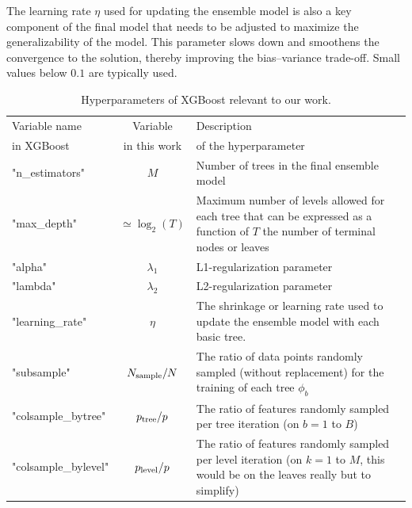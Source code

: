 \documentclass[main]{subfiles}
\begin{document}
The learning rate $\eta$ used for updating the ensemble model is also a key component of the final model that needs to be adjusted to maximize the generalizability of the model. This parameter slows down and smoothens the convergence to the solution, thereby improving the bias--variance trade-off. Small values below $0.1$ are typically used.

\begin{table}[ht]
  \setlength{\extrarowheight}{1pt}
  \centering
  \begin{tabular}{|l|c|m{8cm}|}
  \hline
    Variable name  &  Variable   &   Description\\
    in XGBoost  &    in this work &  of the hyperparameter \\
  \hline
      "n\_estimators" &   $M$ &   Number of trees in the final ensemble model  \\
      "max\_depth" &      $\simeq\log_2(T)$ &   Maximum number of levels allowed for each tree that can be expressed as a function of $T$ the number of terminal nodes or leaves \\
      "alpha" &   $\lambda_1$ &   L1-regularization parameter  \\
      "lambda" &   $\lambda_2$ &  L2-regularization parameter  \\
      "learning\_rate" &   $\eta$ &   The shrinkage or learning rate used to update the ensemble model with each basic tree.  \\
      "subsample" &   $N_{\text{sample}}/N$ &   The ratio of data points randomly sampled (without replacement) for the training of each tree $\phi_b$  \\
      "colsample\_bytree" &   $p_{\text{tree}}/p$  &   The ratio of features randomly sampled per tree iteration (on $b=1$ to $B$)  \\
      "colsample\_bylevel" &   $p_{\text{level}}/p$  &   The ratio of features randomly sampled per level iteration (on $k=1$ to $M$, this would be on the leaves really but to simplify) \\
  \hline
  \end{tabular}
  \caption{Hyperparameters of XGBoost relevant to our work.}\label{tab:hyperparameter}
\end{table}
\end{document}
